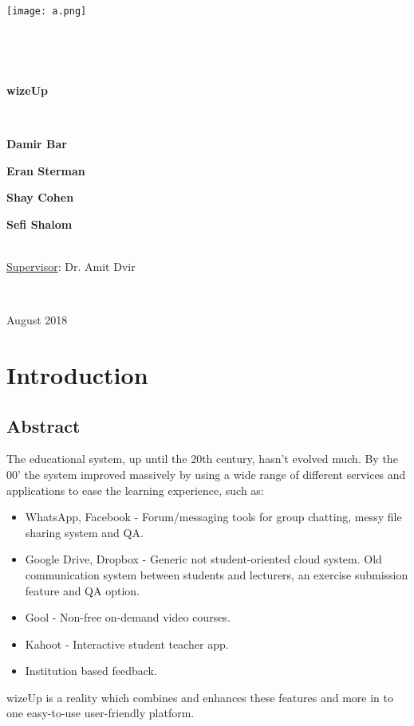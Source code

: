\documentclass[12pt,a4paper]{article}
\begin{document}
{\centering
\texttt{[image: a.png]}

\

\

{\huge \textbf{wizeUp}}


\

\textbf{Damir Bar}

\textbf{Eran Sterman}

\textbf{Shay Cohen}

\textbf{Sefi Shalom}\\

\

{\underline{Supervisor}}: Dr. Amit Dvir

\

August 2018

}


    \newpage

    \tableofcontents

    \newpage

    \section{Introduction}

    \subsection{Abstract}

    The educational system, up until the 20th century, hasn't evolved much. By the 00' the system improved massively by using a wide range of different services and applications to ease the learning experience, such as:

    \begin{itemize}
        \item WhatsApp, Facebook - Forum/messaging tools for group chatting,
        messy file sharing system and QA.
        \item Google Drive, Dropbox - Generic not student-oriented cloud system.
        Old communication system between students and lecturers, an exercise
        submission feature and QA option.
        \item Gool - Non-free on-demand video courses.
        \item Kahoot - Interactive student teacher app.
        \item Institution based feedback.
    \end{itemize}
    wizeUp is a reality which combines
    and enhances these features and more in to one easy-to-use user-friendly
    platform.
\end{document}
